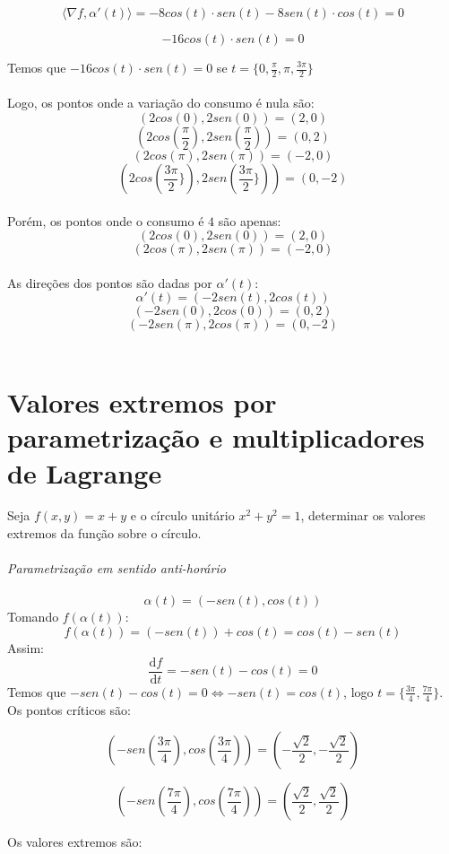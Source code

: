 \documentclass[11pt]{article}
\begin{document}
$$\langle \nabla f, \alpha'(t) \rangle = -8cos(t) \cdot sen(t) - 8sen(t) \cdot cos(t) = 0$$

$$-16cos(t) \cdot sen(t) = 0$$

Temos que $-16cos(t) \cdot sen(t) = 0$ se $t = \{ 0, \frac{\pi}{2}, \pi, \frac{3\pi}{2}\}$\\
\\
Logo, os pontos onde a variação do consumo é nula são:\\
$$(2cos(0), 2sen(0)) = (2, 0)$$
$$(2cos(\frac{\pi}{2}), 2sen(\frac{\pi}{2})) = (0, 2)$$
$$(2cos(\pi), 2sen(\pi)) = (-2, 0)$$
$$(2cos(\frac{3\pi}{2}\}), 2sen(\frac{3\pi}{2}\})) = (0, -2)$$\\

Porém, os pontos onde o consumo é $4$ são apenas:\\
$$(2cos(0), 2sen(0)) = (2, 0)$$
$$(2cos(\pi), 2sen(\pi)) = (-2, 0)$$
\\
As direções dos pontos são dadas por $\alpha'(t)$:\\
$$\alpha'(t) = (-2sen(t), 2cos(t))$$
$$(-2sen(0), 2cos(0)) = (0, 2)$$
$$(-2sen(\pi), 2cos(\pi)) = (0, -2)$$\\

\section{Valores extremos por parametrização e multiplicadores de Lagrange}

Seja $f(x, y) = x + y$ e o círculo unitário $x^2 + y^2 = 1$, determinar os valores extremos da função sobre o círculo.\\
\\
\textit{Parametrização em sentido anti-horário}\\
\\
$$\alpha(t) = (-sen(t), cos(t))$$
Tomando $f(\alpha(t))$:
$$f(\alpha(t)) = (-sen(t)) + cos(t) = cos(t) - sen(t)$$
Assim:
$$\frac{\mathrm{d} f}{\mathrm{d} t} = -sen(t) - cos(t) = 0$$
Temos que $-sen(t) - cos(t) = 0 \Leftrightarrow -sen(t) = cos(t)$, logo $t = \{ \frac{3\pi}{4}, \frac{7\pi}{4} \}$. Os pontos críticos são:

$$\left(-sen \left(\frac{3\pi}{4} \right), cos \left(\frac{3\pi}{4} \right) \right) = \left( - \frac{\sqrt{2}}{2}, - \frac{\sqrt{2}}{2}\right)$$

$$\left(-sen \left(\frac{7\pi}{4} \right), cos \left(\frac{7\pi}{4} \right) \right) = \left( \frac{\sqrt{2}}{2}, \frac{\sqrt{2}}{2}\right)$$

Os valores extremos são:
\end{document}
